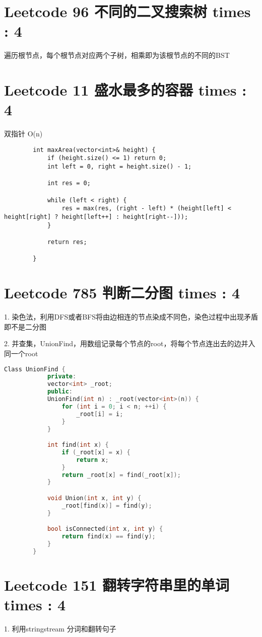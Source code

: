 \documentclass[UTF8]{ctexart}
\begin{document}
\section{Leetcode 96 不同的二叉搜索树 times : 4}
遍历根节点，每个根节点对应两个子树，相乘即为该根节点的不同的BST

\section{Leetcode 11 盛水最多的容器 times : 4}
双指针 O(n)
\begin{framed}
	\begin{lstlisting}
		int maxArea(vector<int>& height) {
			if (height.size() <= 1) return 0;
			int left = 0, right = height.size() - 1;

			int res = 0;

			while (left < right) {
				res = max(res, (right - left) * (height[left] < height[right] ? height[left++] : height[right--]));
			}

			return res;

		}
	\end{lstlisting}
\end{framed}

\section{Leetcode 785 判断二分图 times : 4}
1. 染色法，利用DFS或者BFS将由边相连的节点染成不同色，染色过程中出现矛盾即不是二分图

2. 并查集，UnionFind，用数组记录每个节点的root，将每个节点连出去的边并入同一个root
\begin{framed}
	\begin{lstlisting}[language=C++]
		Class UnionFind {
			private:
			vector<int> _root;
			public:
			UnionFind(int n) : _root(vector<int>(n)) {
				for (int i = 0; i < n; ++i) {
					_root[i] = i;
				}
			}

			int find(int x) {
				if (_root[x] = x) {
					return x;
				}
				return _root[x] = find(_root[x]);
			}

			void Union(int x, int y) {
				_root[find(x)] = find(y);
			}

			bool isConnected(int x, int y) {
				return find(x) == find(y);
			}
		}
	\end{lstlisting}
\end{framed}

\section{Leetcode 151 翻转字符串里的单词 times : 4}
1. 利用stringstream 分词和翻转句子
\end{document}
